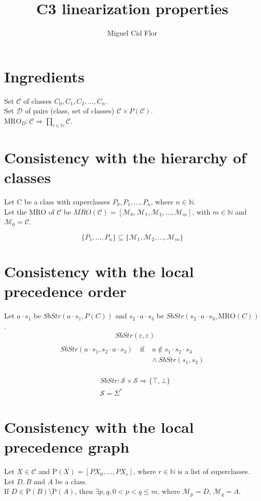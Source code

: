 \documentclass{article}
\author{Miguel Cid Flor}
\title{C3 linearization properties}
\begin{document}
\maketitle
\section*{Ingredients}

Set $\mathcal{C}$ of classes $C_0, C_1, C_2, \ldots, C_n$.\\
Set $\mathcal{D}$ of pairs (class, set of classes) $\mathcal{C} \times P(\mathcal{C})$.\\
$\text{MRO}_D : \mathcal{C} \Rightarrow \prod_{i \in \mathbb{N}} \mathcal{C}$.


\section*{Consistency with the hierarchy of classes} 

Let {C} be a class with superclasses $P_0, P_1, \dots, P_n$, where $n \in \mathbb{N}$. \\
Let the MRO of $\mathcal{C}$ be $MRO(\mathcal{C}) = [\mathcal{M}_0, \mathcal{M}_1, \mathcal{M}_2, \dots, \mathcal{M}_m]$, with $m \in \mathbb{N}$ and $\mathcal{M}_0 = \mathcal{C}$.

\[
\{P_1, \dots, P_n\} \subseteq \{\mathcal{M}_1, \mathcal{M}_2, \dots, \mathcal{M}_m\}
\]

\section*{Consistency with the local precedence order}
Let $a \cdot s_1$ be $SbStr(a \cdot s_1, P(C))$ and $s_2 \cdot a \cdot s_3$ be $SbStr(s_2 \cdot a \cdot s_3, \text{MRO}(C))$.\\

\begin{align*}
& SbStr(\varepsilon, \varepsilon) \\
\end{align*}
\begin{align*}
    SbStr(a \cdot s_1, s_2 \cdot a \cdot s_3) \quad \text{if } &
    a \notin s_1 \cdot s_2 \cdot s_3 \\
    & \land \ SbStr(s_1, s_3) \\
    \end{align*}
    
\begin{align*}
& SbStr : \mathcal{S} \times \mathcal{S} \Rightarrow \{\top, \bot\} \\
& \mathcal{S} = \Sigma^*
\end{align*}

\section*{Consistency with the local precedence graph}

Let $X\in\mathcal{C}$ and $\text{P}(X) = [PX_0, \dots, PX_r]$, where $r \in \mathbb{N}$ is a list of superclasses. \\
Let $D, B \text{ and } A$ be a class. \\
If $D \in \text{P}(B) \setminus \text{P}(A)$, then $\exists p,q ,0 < p < q \leq m$, where $\mathcal{M}_p = D$, $\mathcal{M}_q = A$.
\end{document}
